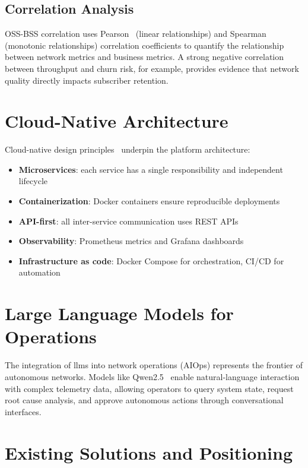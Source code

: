 \subsection{Correlation Analysis}

OSS-BSS correlation uses Pearson~\cite{pearson1895} (linear relationships) and Spearman~\cite{spearman1904} (monotonic relationships) correlation coefficients to quantify the relationship between network metrics and business metrics. A strong negative correlation between throughput and churn risk, for example, provides evidence that network quality directly impacts subscriber retention.

\section{Cloud-Native Architecture}

Cloud-native design principles~\cite{docker2024} underpin the platform architecture:

\begin{itemize}
    \item \textbf{Microservices}: each service has a single responsibility and independent lifecycle
    \item \textbf{Containerization}: Docker containers ensure reproducible deployments
    \item \textbf{API-first}: all inter-service communication uses REST APIs
    \item \textbf{Observability}: Prometheus metrics and Grafana dashboards~\cite{prometheus2024}
    \item \textbf{Infrastructure as code}: Docker Compose for orchestration, CI/CD for automation
\end{itemize}

\section{Large Language Models for Operations}

The integration of \glspl{llm} into network operations (AIOps) represents the frontier of autonomous networks. Models like Qwen2.5~\cite{qwen2024} enable natural-language interaction with complex telemetry data, allowing operators to query system state, request root cause analysis, and approve autonomous actions through conversational interfaces.

\section{Existing Solutions and Positioning}


